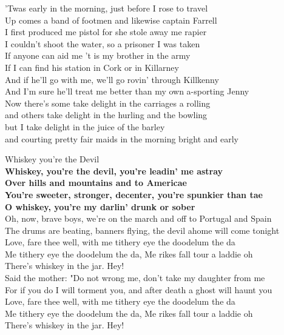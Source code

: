 \documentclass[letterpaper,9pt]{article}
\begin{document}
'Twas early in the morning, just before I rose to travel \\
Up comes a band of footmen and likewise captain Farrell \\
I first produced me pistol for she stole away me rapier \\
I couldn't shoot the water, so a prisoner I was taken \\

If anyone can aid me 't is my brother in the army \\
If I can find his station in Cork or in Killarney \\
And if he'll go with me, we'll go rovin' through Killkenny \\
And I'm sure he'll treat me better than my own a-sporting Jenny \\

Now there's some take delight in the carriages a rolling \\
and others take delight in the hurling and the bowling \\
but I take delight in the juice of the barley \\
and courting pretty fair maids in the morning bright and early \\

\newpage
{}
\Huge
Whiskey you're the Devil\\

\LARGE
\textbf{Whiskey, you're the devil, you're leadin' me astray \\
Over hills and mountains and to Americae \\
You're sweeter, stronger, decenter, you're spunkier than tae \\
O whiskey, you're my darlin' drunk or sober} \\

Oh, now, brave boys, we're on the march and off to Portugal and Spain \\
The drums are beating, banners flying, the devil ahome will come tonight \\
Love, fare thee well, with me tithery eye the doodelum the da \\
Me tithery eye the doodelum the da, Me rikes fall tour a laddie oh \\
There's whiskey in the jar. Hey! \\

Said the mother: "Do not wrong me, don't take my daughter from me \\
For if you do I will torment you, and after death a ghost will haunt you \\
Love, fare thee well, with me tithery eye the doodelum the da \\
Me tithery eye the doodelum the da, Me rikes fall tour a laddie oh \\
There's whiskey in the jar. Hey! \\
\end{document}
